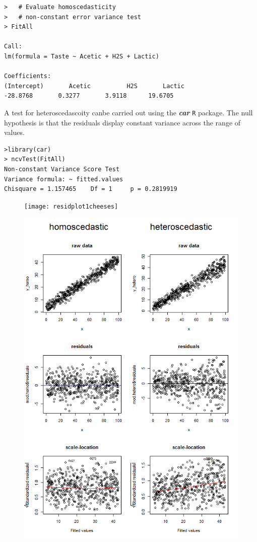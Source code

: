\documentclass[residuals.tex]{subfiles}
\begin{document}
\newpage
\begin{framed}
	\begin{verbatim}	
>	# Evaluate homoscedasticity
>	# non-constant error variance test
> FitAll

Call:
lm(formula = Taste ~ Acetic + H2S + Lactic)

Coefficients:
(Intercept)       Acetic          H2S       Lactic  
-28.8768       0.3277       3.9118      19.6705  
\end{verbatim}
\end{framed}
A test for heteroscedascoity canbe carried out using the \textbf{\textit{car}} \texttt{R} package. The null hypothesis is that the residuals display constant variance across the range of values.

\begin{framed}
\begin{verbatim}
>library(car)
> ncvTest(FitAll)
Non-constant Variance Score Test 
Variance formula: ~ fitted.values 
Chisquare = 1.157465    Df = 1     p = 0.2819919 
	\end{verbatim}
\end{framed}
\begin{figure}[h!]
\centering
\texttt{[image: residplot1cheeses]}
\caption{}
\label{fig:residplot1cheeses}
\end{figure}
\newpage
\begin{figure}[h!]
	\centering
	\includegraphics[width=0.8\linewidth]{homosked2.png}

\end{figure}
\newpage
\end{document}
